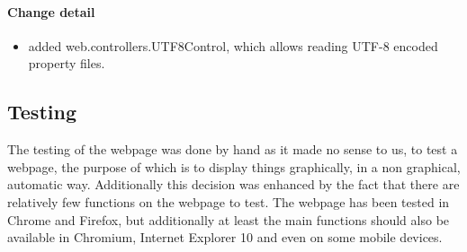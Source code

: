 \paragraph{Change detail}
\begin{itemize}
  \item added web.controllers.UTF8Control, which allows reading UTF-8 encoded property files.
\end{itemize}

\subsection{Testing}
The testing of the webpage was done by hand as it made no sense to us, to test a webpage, 
the purpose of which is to display things graphically, in a non graphical, automatic way.
Additionally this decision was enhanced by the fact that there are relatively few functions on the webpage to test.
The webpage has been tested in Chrome and Firefox, but additionally at least the main functions should also be available in Chromium,
Internet Explorer 10 and even on some mobile devices.
